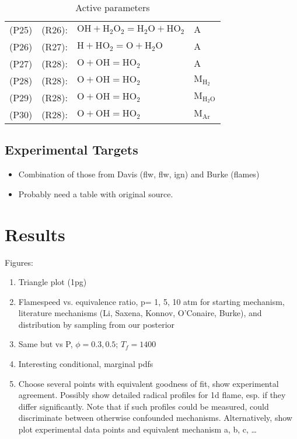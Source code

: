 \documentclass[preprint,3p,times,twocolumn]{elsarticle}
\begin{document}
\begin{itemize}
\begin{table}[htp]
\begin{tabular}{l r l l}
(P25)& (R26): & $ \mathrm{OH} + \mathrm{H}_2\mathrm{O}_2 = \mathrm{H}_2\mathrm{O} + \mathrm{HO}_2     $&$ \mathrm{A}$\\
(P26)& (R27): & $ \mathrm{H} + \mathrm{HO}_2 = \mathrm{O} + \mathrm{H}_2\mathrm{O}     $&$ \mathrm{A}$\\
(P27)& (R28): & $ \mathrm{O} + \mathrm{OH} = \mathrm{HO}_2     $&$ \mathrm{A}$\\
(P28)& (R28): & $ \mathrm{O} + \mathrm{OH} = \mathrm{HO}_2     $&$ \mathrm{M}_{\mathrm{H}_2}$\\
(P29)& (R28): & $ \mathrm{O} + \mathrm{OH} = \mathrm{HO}_2     $&$ \mathrm{M}_{\mathrm{H}_2\mathrm{O}}$\\
(P30)& (R28): & $ \mathrm{O} + \mathrm{OH} = \mathrm{HO}_2     $&$ \mathrm{M}_{\mathrm{Ar}}$\\
\hline
\end{tabular}
    \caption{Active parameters}
    \label{tab:parameters}
  \end{table}
\end{itemize}
\subsection{Experimental Targets}
\begin{itemize}
\item Combination of those from Davis (flw, flw, ign) and Burke
  (flames)
\item Probably need a table with original source.
\end{itemize}
\section{Results}
Figures:
\begin{enumerate}
\item Triangle plot (1pg)
\item Flamespeed vs. equivalence ratio, p= 1, 5, 10 atm for starting
  mechanism, literature mechanisms (Li, Saxena, Konnov, O'Conaire,
  Burke), and distribution by sampling from our posterior
\item Same but vs P, $\phi=0.3,0.5$; $T_f=1400$
    \item Interesting conditional, marginal pdfs
    \item Choose several points with equivalent goodness of fit, show
      experimental agreement. Possibly show detailed radical profiles
      for 1d flame, esp. if they differ significantly. Note that if
      such profiles could be measured, could discriminate between
      otherwise confounded mechanisms. Alternatively, show plot
      experimental data points and equivalent mechanism a, b, c,
      \ldots
 \end{enumerate}
 
\end{document}
